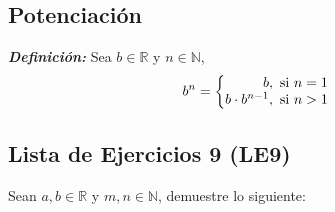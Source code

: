\documentclass[11pt]{article}
\newcommand{\N}{\mathbb{N}}
\newcommand{\R}{\mathbb{R}}
\newcommand{\bfit}[1]{\textbf{\textit{#1}}}
\begin{document}
\subsection*{Potenciación}

\bfit{Definición:}  Sea $b\in \R$ y $n\in \N$,
 \[
  b^n = \left\{
 \begin{array}{@{}r@{\thinspace}l}
  b, &  \ \text{si}  \ n = 1\\
  b\cdot b^{n-1}, &  \ \text{si}  \ n > 1
 \end{array} \right. \]
%
%
\subsection*{Lista de Ejercicios 9 (LE9)}

Sean $a, b\in \R$ y $m,n\in \N$, demuestre lo siguiente:
\end{document}
